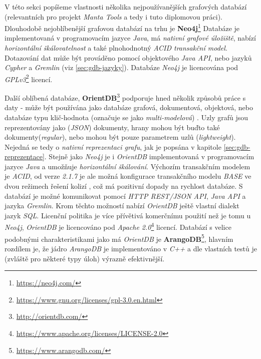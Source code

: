 V této sekci popíšeme vlastnosti několika nejpoužívanějších grafových databází (relevantních pro projekt \textit{Manta Tools} a tedy i tuto diplomovou práci). Dlouhodobě nejoblíbenější grafovou databází na trhu \cite{Ranking17} je \textbf{Neo4j}\footnote{\url{https://neo4j.com/}} Databáze je implementovaná v programovacím jazyce \textit{Java}, má \textit{nativní grafové úložiště}, nabízí \textit{horizontální škálovatelnost} a také plnohodnotný \textit{ACID transakční model}. Dotazování dat může být prováděno pomocí objektového \textit{Java API}, nebo jazyků \textit{Cypher} a \textit{Gremlin} (viz \ref{sec:gdb-jazyky}).
Databáze \textit{Neo4j} je licencována pod \textit{GPLv3}\footnote{\url{https://www.gnu.org/licenses/gpl-3.0.en.html}} licencí.

Další oblíbená databáze, \textbf{OrientDB}\footnote{\url{http://orientdb.com/}} podporuje hned několik způsobů práce s daty - může být používána jako databáze grafová, dokumentová, objektová, nebo databáze typu klič-hodnota (označuje se jako \textit{multi-modelová}) \cite{OrientMultiModel}. Uzly grafů jsou reprezentovány jako (\textit{JSON}) dokumenty, hrany mohou být buďto také dokumenty(\textit{regular}), nebo mohou být pouze parametrem uzlů (\textit{lightweight}). Nejedná se tedy o \textit{nativní reprezentaci grafu}, jak je popsána v kapitole \ref{sec:gdb-reprezentace}.
Stejně jako \textit{Neo4j} je i \textit{OrientDB} implementovaná v programovacím jazyce \textit{Java} a umožňuje \textit{horizontální škálování}. Výchozím transakčním modelem je \textit{ACID}, od verze \textit{2.1.7} je ale možná konfigurace transakčního modelu \textit{BASE} ve dvou režimech řešení kolizí \cite{OrientConsistency}, což má pozitivní dopady na rychlost databáze. S databází je možné komunikovat pomocí \textit{HTTP REST/JSON API}, \textit{Java API} a jazyka \textit{Gremlin}. Krom těchto možností nabízí \textit{OrientDB} ještě vlastní dialekt jazyk \textit{SQL}. Licenční politika je více přívětivá komerčnímu použití než je tomu u \textit{Neo4j}, \textit{OrientDB} je licencováno pod \textit{Apache 2.0}\footnote{\url{https://www.apache.org/licenses/LICENSE-2.0}} licencí.
Databází s velice podobnými charakteristikami jako má \textit{OrientDB} je \textbf{ArangoDB}\footnote{\url{https://www.arangodb.com/}}, hlavním rozdílem je, že jádro \textit{ArangoDB} je implementováno v \textit{C++} a dle vlastních testů \cite{ArangoBenchmark} je (zvláště pro některé typy úloh) výrazně efektivnější.

